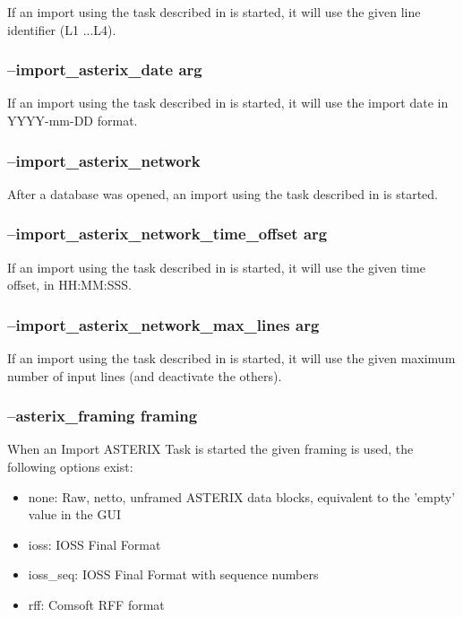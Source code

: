 If an import using the task described in  is started, it will use the given line identifier (L1 ...L4).


\subsubsection{--import\_asterix\_date arg}

If an import using the task described in  is started, it will use the import date in YYYY-mm-DD format.

\subsubsection{--import\_asterix\_network}

After a database was opened, an import using the task described in  is started.

\subsubsection{--import\_asterix\_network\_time\_offset arg}

If an import using the task described in  is started, it will use the given time offset, in HH:MM:SSS.

\subsubsection{--import\_asterix\_network\_max\_lines arg}

If an import using the task described in  is started, it will use the given maximum number of input lines (and deactivate the others).

\subsubsection{--asterix\_framing framing}

When an Import ASTERIX Task is started the given framing is used, the following options exist:

\begin{itemize}
\item none:  Raw, netto, unframed ASTERIX data blocks, equivalent to the 'empty' value in the GUI
\item ioss:  IOSS Final Format
\item ioss\_seq: IOSS Final Format with sequence numbers
\item rff: Comsoft RFF format
\end{itemize}

